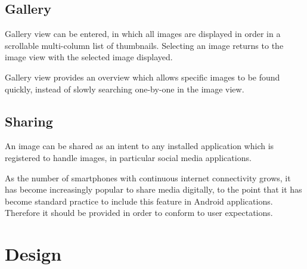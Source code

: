 \documentclass[a4paper,11pt]{article}
\begin{document}
\subsection{Gallery}

Gallery view can be entered, in which all images are displayed in order in a scrollable multi-column list of thumbnails.  Selecting an image returns to the image view with the selected image displayed.

Gallery view provides an overview which allows specific images to be found quickly, instead of slowly searching one-by-one in the image view.

\subsection{Sharing}

An image can be shared as an intent to any installed application which is registered to handle images, in particular social media applications.

As the number of smartphones with continuous internet connectivity grows, it has become increasingly popular to share media digitally, to the point that it has become standard practice to include this feature in Android applications.  Therefore it should be provided in order to conform to user expectations.

\section{Design}  %
\end{document}
